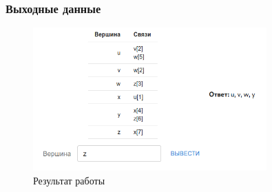 \subsubsection{Выходные данные}
\begin{figure}[H]
  \centering\includegraphics[width=0.8\textwidth]{figs/task-3/res-2.png}
  \caption{Результат работы}
\end{figure}